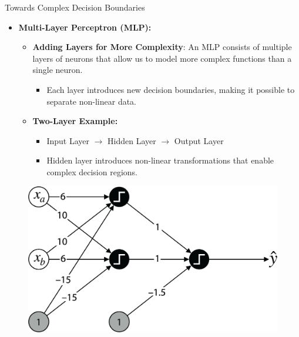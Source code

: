 \documentclass[serif, aspectratio=169]{beamer}
\begin{document}
\begin{frame}{Towards Complex Decision Boundaries}
    \begin{itemize}
        \item \textbf{Multi-Layer Perceptron (MLP):}
        \medskip
        \begin{itemize}\itemsep1em
            \item \justifying \textbf{Adding Layers for More Complexity}:
            An MLP consists of multiple layers of neurons that allow us to model more complex functions than a single neuron.
            \begin{itemize}
                \item \justifying Each layer introduces new decision boundaries, making it possible to separate non-linear data.
            \end{itemize}
            \item \justifying \textbf{Two-Layer Example:}
            \begin{itemize}
                \item Input Layer $\rightarrow$ Hidden Layer $\rightarrow$ Output Layer
                \item Hidden layer introduces non-linear transformations that enable complex decision regions.
            \end{itemize}
        \end{itemize}
    \end{itemize}
    \begin{figure}
        \centering
        \includegraphics[width=0.38\linewidth]{pic/Figure_21.png}
    \end{figure}
\end{frame}
\end{document}
